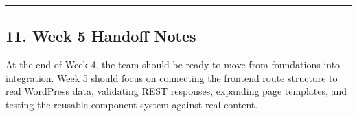 \documentclass[12pt,a4paper]{article}
\begin{document}
\begin{center}\rule{0.5\linewidth}{0.5pt}\end{center}

\subsection{11. Week 5 Handoff Notes}\label{week-5-handoff-notes}

At the end of Week 4, the team should be ready to move from foundations into integration. Week 5 should focus on connecting the frontend route structure to real WordPress data, validating REST responses, expanding page templates, and testing the reusable component system against real content.
\end{document}
